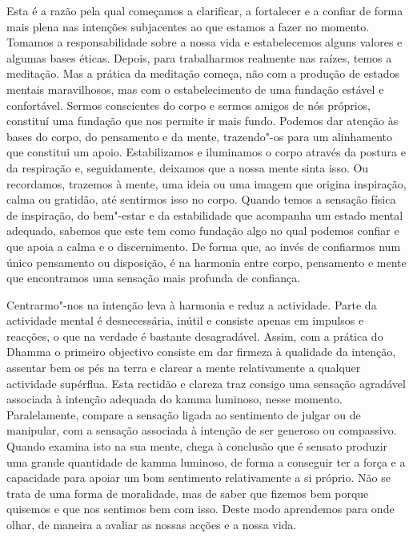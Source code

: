 Esta é a razão pela qual começamos a clarificar, a fortalecer e a confiar de forma mais plena nas intenções subjacentes ao que estamos a fazer no momento. Tomamos a responsabilidade sobre a nossa vida e estabelecemos alguns valores e algumas bases éticas. Depois, para trabalharmos realmente nas raízes, temos a meditação. Mas a prática da meditação começa, não com a produção de estados mentais maravilhosos, mas com o estabelecimento de uma fundação estável e confortável. Sermos conscientes do corpo e sermos amigos de nós próprios, constituí uma fundação que nos permite ir mais fundo. Podemos dar atenção às bases do corpo, do pensamento e da mente, trazendo"-os para um alinhamento que constitui um apoio. Estabilizamos e iluminamos o corpo através da postura e da respiração e, seguidamente, deixamos que a nossa mente sinta isso. Ou recordamos, trazemos à mente, uma ideia ou uma imagem que origina inspiração, calma ou gratidão, até sentirmos isso no corpo. Quando temos a sensação física de inspiração, do bem"-estar e da estabilidade que acompanha um estado mental adequado, sabemos que este tem como fundação algo no qual podemos confiar e que apoia a calma e o discernimento. De forma que, ao invés de confiarmos num único pensamento ou disposição, é na harmonia entre corpo, pensamento e mente que encontramos uma sensação mais profunda de confiança.

Centrarmo"-nos na intenção leva à harmonia e reduz a actividade. Parte da actividade mental é desnecessária, inútil e consiste apenas em impulsos e reacções, o que na verdade é bastante desagradável. Assim, com a prática do Dhamma o primeiro objectivo consiste em dar firmeza à qualidade da intenção, assentar bem os pés na terra e clarear a mente relativamente a qualquer actividade supérflua. Esta rectidão e clareza traz consigo uma sensação agradável associada à intenção adequada do kamma luminoso, nesse momento. Paralelamente, compare a sensação ligada ao sentimento de julgar ou de manipular, com a sensação associada à intenção de ser generoso ou compassivo. Quando examina isto na sua mente, chega à conclusão que é sensato produzir uma grande quantidade de kamma luminoso, de forma a conseguir ter a força e a capacidade para apoiar um bom sentimento relativamente a si próprio. Não se trata de uma forma de moralidade, mas de saber que fizemos bem porque quisemos e que nos sentimos bem com isso. Deste modo aprendemos para onde olhar, de maneira a avaliar as nossas acções e a nossa vida.

